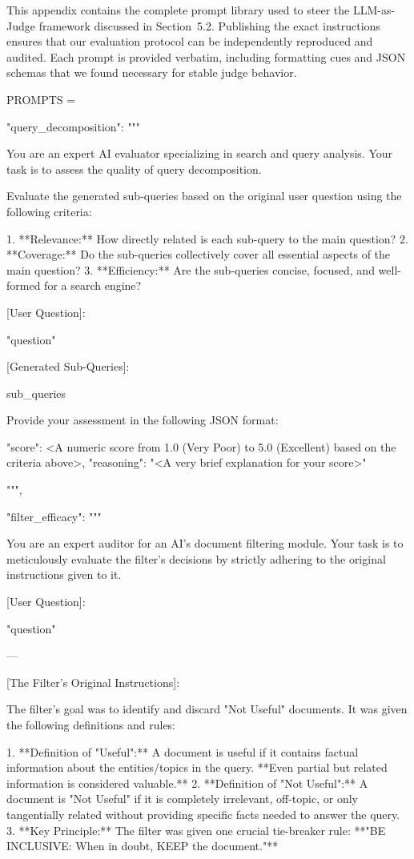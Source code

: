 \documentclass[11pt]{article}
\begin{document}
This appendix contains the complete prompt library used to steer the LLM-as-Judge framework discussed in Section~5.2. Publishing the exact instructions ensures that our evaluation protocol can be independently reproduced and audited. Each prompt is provided verbatim, including formatting cues and JSON schemas that we found necessary for stable judge behavior.

\begin{PromptBlock}
PROMPTS = {

  "query_decomposition": """

  You are an expert AI evaluator specializing in search and query analysis. Your task is to assess the quality of query decomposition.

  Evaluate the generated sub-queries based on the original user question using the following criteria:

  1.  **Relevance:** How directly related is each sub-query to the main question?
  2.  **Coverage:** Do the sub-queries collectively cover all essential aspects of the main question?
  3.  **Efficiency:** Are the sub-queries concise, focused, and well-formed for a search engine?

  [User Question]:

  "{question}"

  [Generated Sub-Queries]:

  {sub_queries}

  Provide your assessment in the following JSON format:

  {{
    "score": <A numeric score from 1.0 (Very Poor) to 5.0 (Excellent) based on the criteria above>,
    "reasoning": "<A very brief explanation for your score>"
  }}

  """,

  "filter_efficacy": """

  You are an expert auditor for an AI's document filtering module. Your task is to meticulously evaluate the filter's decisions by strictly adhering to the original instructions given to it.

  [User Question]:

  "{question}"

  ---

  [The Filter's Original Instructions]:

  The filter's goal was to identify and discard "Not Useful" documents. It was given the following definitions and rules:

  1.  **Definition of "Useful":** A document is useful if it contains factual information about the entities/topics in the query. **Even partial but related information is considered valuable.**
  2.  **Definition of "Not Useful":** A document is "Not Useful" if it is completely irrelevant, off-topic, or only tangentially related without providing specific facts needed to answer the query.
  3.  **Key Principle:** The filter was given one crucial tie-breaker rule: **"BE INCLUSIVE: When in doubt, KEEP the document."**

}
\end{PromptBlock}
\end{document}
